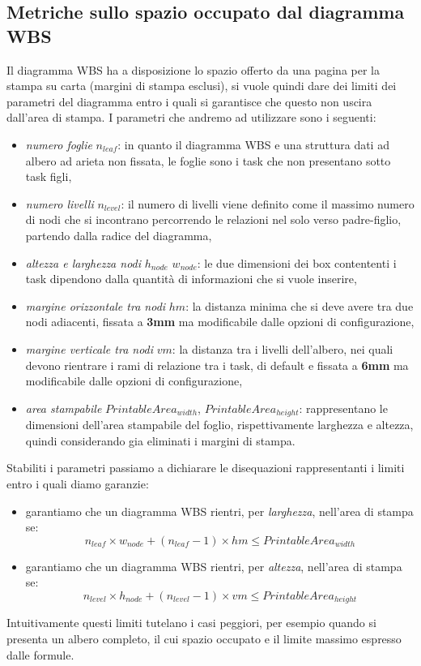 \subsection{Metriche sullo spazio occupato dal diagramma WBS}
Il diagramma WBS ha a disposizione lo spazio offerto da una pagina per la stampa su carta (margini di stampa esclusi), si vuole quindi dare dei limiti dei parametri del diagramma entro i quali si garantisce che questo non uscir\´a dall'area di stampa. 
I parametri che andremo ad utilizzare sono i seguenti:
\begin{itemize}
	\item \emph{numero foglie} $n_{leaf}$: in quanto il diagramma WBS \´e una struttura dati ad albero ad ariet\´a non fissata, le foglie sono i task che non presentano sotto task figli,
	\item \emph{numero livelli} $n_{level}$: il numero di livelli viene definito come il massimo numero di nodi che si incontrano percorrendo le relazioni nel solo verso padre-figlio, partendo dalla radice del diagramma,
	\item \emph{altezza e larghezza nodi} $h_{node}$ $w_{node}$: le due dimensioni dei box contententi i task dipendono dalla quantità di informazioni che si vuole inserire,
	\item \emph{margine orizzontale tra nodi} $hm$: la distanza minima che si deve avere tra due nodi adiacenti, fissata a \textbf{3mm} ma modificabile dalle opzioni di configurazione,
	\item \emph{margine verticale tra nodi} $vm$: la distanza tra i livelli dell'albero, nei quali devono rientrare i rami di relazione tra i task, di default \´e fissata a \textbf{6mm} ma modificabile dalle opzioni di configurazione,
	\item \emph{area stampabile} $PrintableArea_{width}$, $PrintableArea_{height}$: rappresentano le dimensioni dell'area stampabile del foglio, rispettivamente larghezza e altezza, quindi considerando gi\´a eliminati i margini di stampa.
\end{itemize}

Stabiliti i parametri passiamo a dichiarare le disequazioni rappresentanti i limiti entro i quali diamo garanzie:
\begin{itemize}
	\item garantiamo che un diagramma WBS rientri, per \emph{larghezza}, nell'area di stampa se:
	$$ n_{leaf} \times w_{node} + (n_{leaf} - 1) \times hm \leq 
	PrintableArea_{width} $$
	\item garantiamo che un diagramma WBS rientri, per \emph{altezza}, nell'area di stampa se:
	$$ n_{level} \times h_{node} + (n_{level} - 1) \times vm \leq 
	PrintableArea_{height} $$
\end{itemize}
Intuitivamente questi limiti tutelano i casi peggiori, per esempio quando si presenta un albero completo, il cui spazio occupato \´e il limite massimo espresso dalle formule.

